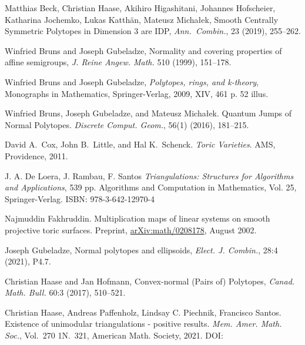\documentclass{amsart}
\theoremstyle{plain}
\theoremstyle{definition}
\begin{document}
\begin{thebibliography}{99} 

Matthias Beck, Christian Haase, Akihiro Higashitani, Johannes Hofscheier, Katharina Jochemko, Lukas Katth\"an, Mateusz Micha{\l}ek,
Smooth Centrally Symmetric Polytopes in Dimension 3 are IDP,
\emph{Ann.~Combin.}, 23 (2019), 255--262.


Winfried Bruns and Joseph Gubeladze, Normality and covering properties of affine semigroups, \emph{J. Reine Angew. Math.} 510 (1999), 151--178. 

Winfried Bruns and Joseph Gubeladze, \emph{Polytopes, rings, and k-theory}, Monographs in Mathematics,
  Springer-Verlag, 2009, XIV, 461 p. 52 illus.
  
  Winfried Bruns, Joseph Gubeladze, and Mateusz Micha{\l}ek. Quantum Jumps of Normal Polytopes. \emph{Discrete Comput. Geom.}, 56(1) (2016), 181--215. 
  
David A.~Cox, John B.~Little, and Hal K.~Schenck.
{\em {T}oric {V}arieties}.
AMS, Providence, 2011.

J. A. De Loera, J. Rambau, F. Santos
\emph{Triangulations: Structures for Algorithms and Applications}, 539 pp.
Algorithms and Computation in Mathematics, Vol. 25, Springer-Verlag. 
ISBN: 978-3-642-12970-4

Najmuddin Fakhruddin.
\newblock Multiplication maps of linear systems on smooth projective toric surfaces.
  Preprint, 
  \href{https://arxiv.org/abs/math/0208178}{arXiv:math/0208178}, August 2002.



Joseph Gubeladze,
Normal polytopes and ellipsoids,
\emph{Elect. J. Combin.}, 28:4 (2021), P4.7.
    

Christian Haase and Jan Hofmann, 
Convex-normal (Pairs of) Polytopes, 
\emph{Canad. Math. Bull.} 60:3 (2017), 510--521. 

Christian Haase, Andreas Paffenholz, Lindsay C. Piechnik, Francisco Santos. Existence of unimodular triangulations - positive results. 
 \emph{Mem. Amer. Math. Soc.},  Vol.~270 1N.~321, American Math. Society, 2021. DOI: 
 

\end{thebibliography}
\end{document}
